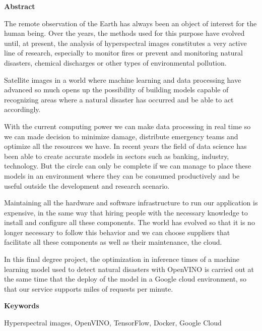 \begin{center}
{\bf \Huge Abstract}

\end{center}

The remote observation of the Earth has always been an object of interest for the human being.
Over the years, the methods used for this purpose have evolved until, at present, the analysis of hyperspectral images constitutes a very active line of research, especially
to monitor fires or prevent and monitoring natural disasters, chemical discharges or other types of environmental pollution.

Satellite images in a world where machine learning and data processing have advanced so much opens up the possibility of building models capable of recognizing areas where a natural
disaster has occurred and be able to act accordingly.

With the current computing power we can make data processing in real time so we can made decision to minimize damage, distribute emergency teams and optimize all the resources we have.
In recent years the field of data science has been able to create accurate models in sectors such as banking, industry, technology.
But the circle can only be complete if we can manage to place these models in an environment where they can be consumed productively and be useful outside the development and research scenario.

Maintaining all the hardware and software infrastructure to run our application is expensive, in the same way that hiring people with the necessary
knowledge to install and configure all these components.
The world has evolved so that it is no longer necessary to follow this behavior and we can choose suppliers that facilitate all these components as well as their maintenance, the cloud.

In this final degree project, the optimization in inference times of a machine learning model used to detect natural disasters with OpenVINO is carried out at the same time that the
deploy of the model in a Google cloud environment, so that our service supports miles of requests per minute.

\vspace{0.8cm}
\begin{center}

{\bf \Large Keywords}

\end{center}


Hyperspectral images, OpenVINO, TensorFlow, Docker, Google Cloud
\vspace{0.5cm}

\mbox{}
